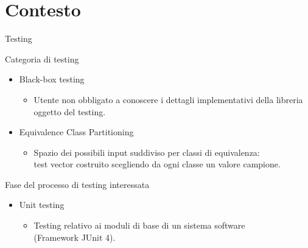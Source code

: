 \documentclass{beamer}
\begin{document}
\section{Contesto}
\begin{frame}{Testing}
   
        {
        \begin{block}{Categoria di testing}
        \begin{itemize}
        \setlength\itemsep{1em}
        \item Black-box testing\\
			\begin{itemize}        
        		\item[]Utente non obbligato a conoscere i dettagli implementativi della libreria oggetto del testing.
        	\end{itemize}        
        \item Equivalence Class Partitioning\\
			\begin{itemize}         	
       			\item[]Spazio dei possibili input suddiviso per classi di equivalenza:\\
       			test vector costruito scegliendo da ogni classe un valore campione.
       		\end{itemize}  

		\end{itemize}        
        \end{block}
        }
   
        {
        \begin{block}{Fase del processo di testing interessata}
        \begin{itemize}
        \setlength\itemsep{1em}
        \item Unit testing\\
        
        	\begin{itemize}  
        	\item[]Testing relativo ai moduli di base di un sistema software\\ (Framework JUnit 4).\\
        	\end{itemize}  

        \end{itemize}
        \end{block}
        }
\end{frame}
\end{document}
